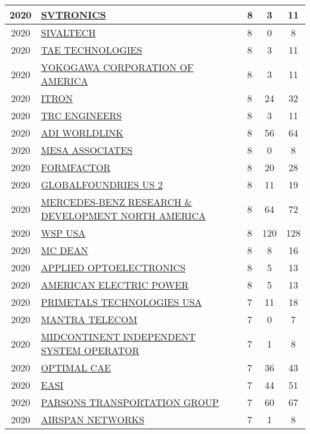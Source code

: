 \documentclass{article}%
\begin{document}
\begin{longtable}{c|p{20em}|p{5em}|c|c}
\hline%
2020&\hyperref[subsec:SVTRONICS]{SVTRONICS}&8&3&11\\%
\hline%
2020&\hyperref[subsec:SIVALTECH]{SIVALTECH}&8&0&8\\%
\hline%
2020&\hyperref[subsec:TAETECHNOLOGIES]{TAE TECHNOLOGIES}&8&3&11\\%
\hline%
2020&\hyperref[subsec:YOKOGAWACORPORATIONOFAMERICA]{YOKOGAWA CORPORATION OF AMERICA}&8&3&11\\%
\hline%
2020&\hyperref[subsec:ITRON]{ITRON}&8&24&32\\%
\hline%
2020&\hyperref[subsec:TRCENGINEERS]{TRC ENGINEERS}&8&3&11\\%
\hline%
2020&\hyperref[subsec:ADIWORLDLINK]{ADI WORLDLINK}&8&56&64\\%
\hline%
2020&\hyperref[subsec:MESAASSOCIATES]{MESA ASSOCIATES}&8&0&8\\%
\hline%
2020&\hyperref[subsec:FORMFACTOR]{FORMFACTOR}&8&20&28\\%
\hline%
2020&\hyperref[subsec:GLOBALFOUNDRIESUS2]{GLOBALFOUNDRIES US 2}&8&11&19\\%
\hline%
2020&\hyperref[subsec:MERCEDES{-}BENZRESEARCHDEVELOPMENTNORTHAMERICA]{MERCEDES{-}BENZ RESEARCH \& DEVELOPMENT NORTH AMERICA}&8&64&72\\%
\hline%
2020&\hyperref[subsec:WSPUSA]{WSP USA}&8&120&128\\%
\hline%
2020&\hyperref[subsec:MCDEAN]{MC DEAN}&8&8&16\\%
\hline%
2020&\hyperref[subsec:APPLIEDOPTOELECTRONICS]{APPLIED OPTOELECTRONICS}&8&5&13\\%
\hline%
2020&\hyperref[subsec:AMERICANELECTRICPOWER]{AMERICAN ELECTRIC POWER}&8&5&13\\%
\hline%
2020&\hyperref[subsec:PRIMETALSTECHNOLOGIESUSA]{PRIMETALS TECHNOLOGIES USA}&7&11&18\\%
\hline%
2020&\hyperref[subsec:MANTRATELECOM]{MANTRA TELECOM}&7&0&7\\%
\hline%
2020&\hyperref[subsec:MIDCONTINENTINDEPENDENTSYSTEMOPERATOR]{MIDCONTINENT INDEPENDENT SYSTEM OPERATOR}&7&1&8\\%
\hline%
2020&\hyperref[subsec:OPTIMALCAE]{OPTIMAL CAE}&7&36&43\\%
\hline%
2020&\hyperref[subsec:EASI]{EASI}&7&44&51\\%
\hline%
2020&\hyperref[subsec:PARSONSTRANSPORTATIONGROUP]{PARSONS TRANSPORTATION GROUP}&7&60&67\\%
\hline%
2020&\hyperref[subsec:AIRSPANNETWORKS]{AIRSPAN NETWORKS}&7&1&8\\%

\end{longtable}
\end{document}
